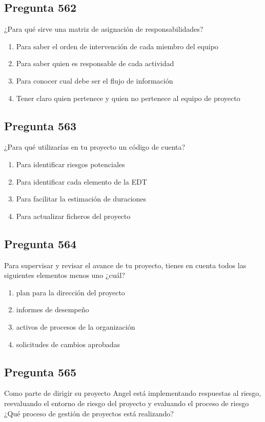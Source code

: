 \documentclass[11pt,a4paper]{article}
\begin{document}
\subsection*{Pregunta 562}
¿Para qué sirve una matriz de asignación de responsabilidades?

\begin{enumerate}[label=\alph*)]
  \item Para saber el orden de intervención de cada miembro del equipo
  \item Para saber quien es responsable de cada actividad
  \item Para conocer cual debe ser el flujo de información
  \item Tener claro quien pertenece y quien no pertenece al equipo de proyecto
\end{enumerate}

\subsection*{Pregunta 563}
¿Para qué utilizarías en tu proyecto un código de cuenta?

\begin{enumerate}[label=\alph*)]
  \item Para identificar riesgos potenciales
  \item Para identificar cada elemento de la EDT
  \item Para facilitar la estimación de duraciones
  \item Para actualizar ficheros del proyecto
\end{enumerate}

\subsection*{Pregunta 564}
Para supervisar y revisar el avance de tu proyecto, tienes en cuenta todos las siguientes elementos menos uno ¿cuál?

\begin{enumerate}[label=\alph*)]
  \item plan para la dirección del proyecto
  \item informes de desempeño
  \item activos de procesos de la organización
  \item solicitudes de cambios aprobadas
\end{enumerate}

\subsection*{Pregunta 565}
Como parte de dirigir su proyecto Angel está implementando respuestas al riesgo, reevaluando el entorno de riesgo del proyecto y evaluando el proceso de riesgo ¿Qué proceso de gestión de proyectos está realizando?
\end{document}
